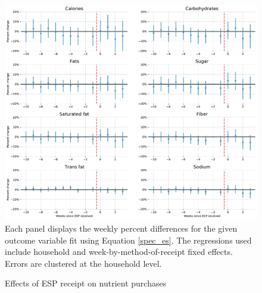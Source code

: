 \documentclass[12pt]{article}
\begin{document}
\clearpage
\begin{figure}[t]
\begin{center}
\caption{Effects of ESP receipt on nutrient purchases}
\label{es_nutrients_all}
\includegraphics[width=1\textwidth, angle=0]{../figures/es_nutrients_all.pdf}
\footnotesize Each panel displays the weekly percent differences for the given outcome variable fit using Equation \ref{spec_es}. The regressions used include household and week-by-method-of-receipt fixed effects. Errors are clustered at the household level. \end{center}
\end{figure}
\end{document}

